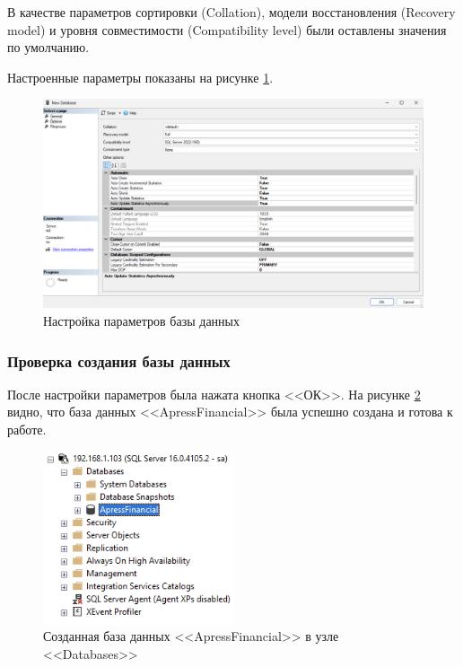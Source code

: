 \documentclass[a4paper, 14pt]{extarticle}
\begin{document}
В качестве параметров сортировки (Collation), модели восстановления (Recovery
model) и уровня совместимости (Compatibility level) были оставлены значения по
умолчанию.

Настроенные параметры показаны на рисунке \ref{fig:task-1/step-4.png}.

\begin{figure}[H]
  \centering
  \includegraphics[width=\textwidth]{images/task-1/step-4.png}
  \caption{Настройка параметров базы данных}
  \label{fig:task-1/step-4.png}
\end{figure}

\subsubsection{Проверка создания базы данных}

После настройки параметров была нажата кнопка <<ОК>>. На рисунке
\ref{fig:task-1/step-5.png} видно, что база данных <<ApressFinancial>> была
успешно создана и готова к работе.

\begin{figure}[H]
  \centering
  \includegraphics[width=0.5\textwidth]{images/task-1/step-5.png}
  \caption{Созданная база данных <<ApressFinancial>> в узле <<Databases>>}
  \label{fig:task-1/step-5.png}
\end{figure}
\end{document}
